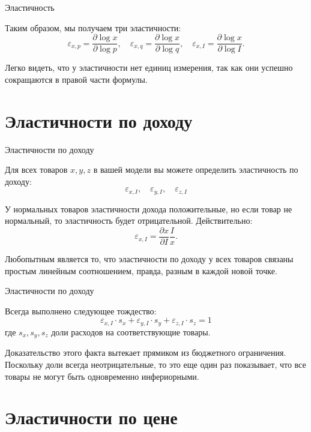 \documentclass{beamer}
\begin{document}
\begin{frame}{Эластичность}

Таким образом, мы получаем три эластичности:
$$\varepsilon_{x,p} = \frac{\partial \log x}{\partial \log p}, \quad \varepsilon_{x,q} = \frac{\partial \log x}{\partial \log q}, \quad \varepsilon_{x,I} = \frac{\partial \log x}{\partial \log I}.$$

Легко видеть, что у эластичности нет единиц измерения, так как они успешно сокращаются в правой части формулы. 

\end{frame}

\section{Эластичности по доходу}

\begin{frame}{Эластичности по доходу}

Для всех товаров $x,y,z$ в вашей модели вы можете определить эластичность по доходу:
$$\varepsilon_{x,I}, \quad \varepsilon_{y,I}, \quad \varepsilon_{z,I}$$

У нормальных товаров эластичности дохода положительные, но если товар не нормальный, то эластичность будет отрицательной. Действительно:
$$\varepsilon_{x,I} = \frac{\partial x}{\partial I} \frac{I}{x}.$$

Любопытным является то, что эластичности по доходу у всех товаров связаны простым линейным соотношением, правда, разным в каждой новой точке.

\end{frame}

\begin{frame}{Эластичности по доходу}

\begin{lemma}
Всегда выполнено следующее тождество:
$$\varepsilon_{x,I} \cdot s_x + \varepsilon_{y,I} \cdot s_y + \varepsilon_{z,I} \cdot s_z = 1$$
где $s_x, s_y, s_z$ доли расходов на соответствующие товары.
\end{lemma}

Доказательство этого факта вытекает прямиком из бюджетного ограничения. Поскольку доли всегда неотрицателъные, то это еще один раз показывает, что все товары не могут быть одновременно инфериорными.

\end{frame}

\section{Эластичности по цене}
\end{document}

